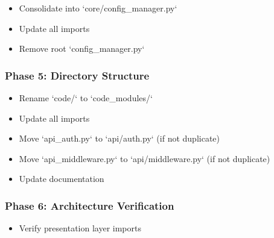 \documentclass[11pt,a4paper]{article}
\begin{document}
\begin{itemize}
\item [ ] Consolidate into `core/config_manager.py`
\end{itemize}

\begin{itemize}
\item [ ] Update all imports
\end{itemize}

\begin{itemize}
\item [ ] Remove root `config_manager.py`
\end{itemize}

\subsubsection{Phase 5: Directory Structure}

\begin{itemize}
\item [ ] Rename `code/` to `code_modules/`
\end{itemize}

\begin{itemize}
\item [ ] Update all imports
\end{itemize}

\begin{itemize}
\item [ ] Move `api_auth.py` to `api/auth.py` (if not duplicate)
\end{itemize}

\begin{itemize}
\item [ ] Move `api_middleware.py` to `api/middleware.py` (if not duplicate)
\end{itemize}

\begin{itemize}
\item [ ] Update documentation
\end{itemize}

\subsubsection{Phase 6: Architecture Verification}

\begin{itemize}
\item [ ] Verify presentation layer imports
\end{itemize}
\end{document}
